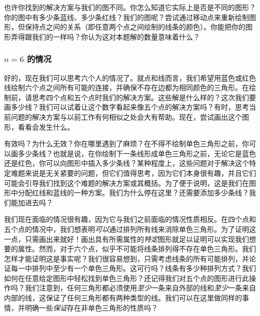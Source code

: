 也许你找到的解决方案与我们的图不同。你怎么知道它实际上是否是不同的图形？你的图中有多少条蓝线、多少条红线？我们的图呢？尝试通过移动点来重新绘制图形，但保持点之间的关系（即任意两个点之间绘制的线条的颜色）。你能把你的图形弄得跟我们的一样吗？你认为这对本题解的数量意味着什么？

\subsubsection*{$n=6$ 的情况}

好的，现在我们可以思考六个人的情况了。就点和线而言，我们希望用蓝色或红色线绘制六个点之间所有可能的连接，并确保不存在边都为相同颜色的三角形。在绘制前，请思考四个点和五个点时我们的解决方案。这些解是什么样的？这次我们要画多少线？我们可以试着让这个数字看起来像五个点的解决方案吗？有时，思考当前问题的解决方案与以前工作有何相似之处会大有帮助。现在，尝试画出这个图形，看看会发生什么。

有效吗？为什么无效？你在哪里遇到了麻烦？在不得不绘制单色三角形之前，你可以画多少条线？也就是说，在你绘制下一条线形成单色三角形之前，无论它是蓝色还是红色，你可以向图形中插入多少条线？某种程度上，这些问题对于解决这个特定难题来说是无关紧要的问题，但它们值得思考，因为它们本身很有趣，并且它们可能会引导我们找到这个难题的解决方案或其概括。为了便于说明，这是我们在图形中分配红线和蓝线的一种方案。我们为什么停在这里？还需要添加多少条线？我们能加进去吗？

\begin{center}
\end{center}

我们现在面临的情况很有趣，因为它与我们之前面临的情况性质相反。在四个点和五个点的情况中，我们想表明\textit{可以}通过排列所有线来消除单色三角形。为了证明这一点，只需画出来就好！画出具有所需属性的\textit{特定}图形就足以证明可以实现我们想要的属性。然而，对于六个点，似乎不可能将线条排列得不存在单色三角形。我们怎样才能证明这是事实呢？我们很容易想到，只需考虑线条的所有可能排列，并论证每一中排列中至少有一个单色三角形。这可行吗？线条有多少种排列方式？我们如何在任意给定图形中轻松找到单色三角形？还记得我们对五个点的图形进行此操作吗？我们注意到，任何三角形都必须使用\textit{至少}一条来自外部的线和\textit{至少}一条来自内部的线，这保证了任何三角形都有两种类型的线。我们可以在这里做同样的事情，并明确一些\textit{保证}存在非单色三角形的性质吗？

